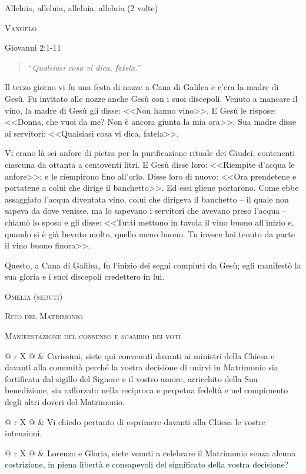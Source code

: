 \documentclass[12pt,twoside]{article}
\makeatletter
\newcommand{\htwo}[1]{{\Large\scshape #1}}
\newcommand{\masspart}[1]{\bigskip

  \htwo{#1}}
\newcommand{\masssubpart}[1]{\bigskip

  {\large\scshape #1}}
\newcommand{\sayline}[2]{
  \begin{tabularx}{\textwidth}{@{} r X @{}}
    \makebox[6.0em][r]{\ifx&#1& #1 \else \textit{#1:} \fi} & #2
\end{tabularx}}
\newcommand{\reading}[2]{#1\hdashrule{\fill}{1pt}{1pt}#2}
\newcommand{\readingquote}[1]{
\begin{quote}
``\textit{#1}''
\end{quote}
}
\makeatother
\begin{document}
Alleluia, alleluia, alleluia, alleluia (2 volte)

\newpage

\masssubpart{Vangelo}

\reading{Giovanni 2:1-11}
\readingquote{Qualsiasi cosa vi dica, fatela.}

Il terzo giorno vi fu una festa di nozze a Cana di Galilea e c'era la madre di Gesù. Fu invitato alle nozze anche Gesù con i suoi discepoli. Venuto a mancare il vino, la madre di Gesù gli disse: <<Non hanno vino>>. E Gesù le rispose: <<Donna, che vuoi da me? Non è ancora giunta la mia ora>>. Sua madre disse ai servitori: <<Qualsiasi cosa vi dica, fatela>>.

Vi erano là sei anfore di pietra per la purificazione rituale dei Giudei, contenenti ciascuna da ottanta a centoventi litri. E Gesù disse loro: <<Riempite d'acqua le anfore>>; e le riempirono fino all'orlo. Disse loro di nuovo: <<Ora prendetene e portatene a colui che dirige il banchetto>>. Ed essi gliene portarono. Come ebbe assaggiato l'acqua diventata vino, colui che dirigeva il banchetto -- il quale non sapeva da dove venisse, ma lo sapevano i servitori che avevano preso l'acqua -- chiamò lo sposo e gli disse: <<Tutti mettono in tavola il vino buono all'inizio e, quando si è già bevuto molto, quello meno buono. Tu invece hai tenuto da parte il vino buono finora>>.

Questo, a Cana di Galilea, fu l'inizio dei segni compiuti da Gesù; egli manifestò la sua gloria e i suoi discepoli credettero in lui.


\masssubpart{Omelia (seduti)}

\newpage

\masspart{Rito del Matrimonio}

\masssubpart{Manifestazione del consenso e scambio dei voti}

\sayline{Celebrante}{Carissimi, siete qui convenuti davanti ai ministri della Chiesa e davanti alla comunità perché la vostra decisione di unirvi in Matrimonio sia fortificata dal sigillo del Signore e il vostro amore, arricchito della Sua benedizione, sia rafforzato nella reciproca e perpetua fedeltà e nel compimento degli altri doveri del Matrimonio.}

\sayline{}{Vi chiedo pertanto di esprimere davanti alla Chiesa le vostre intenzioni.}

\sayline{}{Lorenzo e Gloria, siete venuti a celebrare il Matrimonio senza alcuna costrizione, in piena libertà e consapevoli del significato della vostra decisione?}
\end{document}
